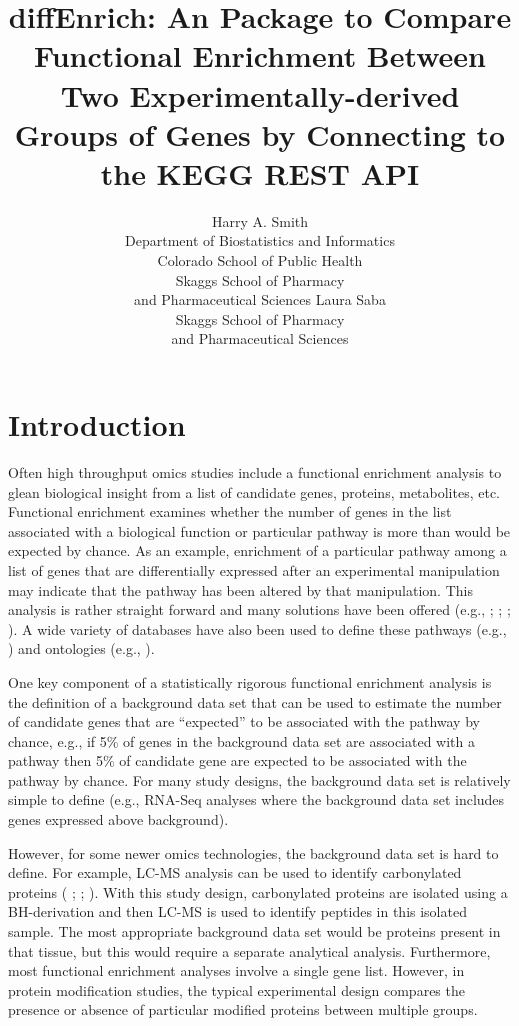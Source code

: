 \documentclass[article]{jss}\usepackage[]{graphicx}\usepackage[]{color}
\author{Harry A. Smith\\Department of Biostatistics and Informatics
\\Colorado School of Public Health\\Skaggs School of Pharmacy\\and
Pharmaceutical Sciences
   \And Laura Saba\\Skaggs School of Pharmacy\\and
Pharmaceutical Sciences}
\title{diffEnrich: An \proglang{R} Package to Compare Functional Enrichment Between Two
Experimentally-derived Groups of Genes by Connecting to the KEGG REST API}
\begin{document}


\section[Introduction]{Introduction} \label{sec:intro}

Often high throughput omics studies include a functional enrichment analysis to
glean biological insight from a list of candidate genes, proteins, metabolites,
etc. Functional enrichment examines whether the number of genes in the list
associated with a biological function or particular pathway is more than would
be expected by chance. As an example, enrichment of a particular pathway among
a list of genes that are differentially expressed after an experimental
manipulation may indicate that the pathway has been altered by that
manipulation. This analysis is rather straight forward and many solutions have
been offered (e.g., \cite{HuangDW:2009}; \cite{Kuleshov:2016}; \cite{Liao:2019};
\cite{Subramanian:2005}). A wide variety of databases have also been
used to define these pathways (e.g., \cite{KEGG:2000}) and ontologies
(e.g., \cite{Ashburner:2000}).

One key component of a statistically rigorous functional enrichment analysis is
the definition of a background data set that can be used to estimate the number
of candidate genes that are ``expected'' to be associated with the pathway by
chance, e.g., if 5\% of genes in the background data set are associated with
a pathway then 5\% of candidate gene are expected to be associated with the
pathway by chance. For many study designs, the background data set is
relatively simple to define (e.g., RNA-Seq analyses where the background data
set includes genes expressed above background).

However, for some newer omics technologies, the background data set is hard to
define. For example, LC-MS analysis can be used to identify carbonylated
proteins ( \cite{Petersen:2018}; \cite{Shearn:2019}; \cite{Shearn:2018}).
With this study design, carbonylated proteins are isolated using a BH-derivation
and then LC-MS is used to identify peptides in this isolated sample. The most
appropriate background data set would be proteins present in that tissue, but
this would require a separate analytical analysis. Furthermore, most functional
enrichment analyses involve a single gene list. However, in protein modification
studies, the typical experimental design compares the presence or absence of
particular modified proteins between multiple groups.
\end{document}
